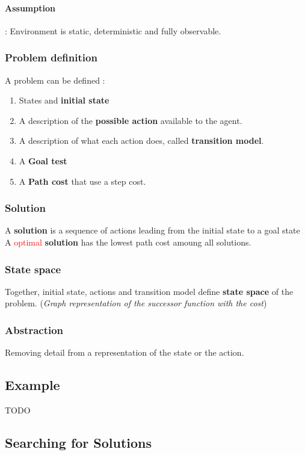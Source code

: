 \paragraph{Assumption} : Environment is  static, deterministic and fully
observable.

\subsubsection{Problem definition}
A problem can be defined :
\begin{enumerate}
    \item States and \textbf{initial state}
    \item A description of the  \textbf{possible action} available to the
    agent. 
    \item A description of what each action does, called \textbf{transition
        model}. 
    \item A \textbf{Goal test}
    \item A \textbf{Path cost} that use a step cost.
\end{enumerate}

\subsubsection{Solution} 
A  \textbf{solution}  is a  sequence  of actions  leading
from  the  initial state  to  a  goal state  A  \textcolor{red}{optimal}
\textbf{solution} has the lowest path cost amoung all solutions.

\subsubsection{State space}
Together,   initial  state,   actions   and   transition  model   define
\textbf{state space}  of the  problem. (\textit{Graph  representation of
the successor function with the cost})

\subsubsection{Abstraction}
Removing detail from a representation of the state or the action.

\subsection{Example}
TODO


\subsection{Searching for Solutions}


